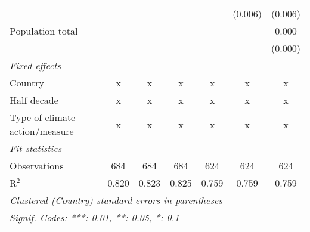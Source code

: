 \begin{tabular}{lcccccc}
                                                      &               &               &               &               & (0.006)       & (0.006)\\   
   Population total                                   &               &               &               &               &               & 0.000\\   
                                                      &               &               &               &               &               & (0.000)\\   
   \emph{Fixed effects}\\
   Country                                            & x             & x             & x             & x             & x             & x\\  
   Half decade                                        & x             & x             & x             & x             & x             & x\\  
   Type of climate action/measure                     & x             & x             & x             & x             & x             & x\\  
   \midrule \emph{Fit statistics}\\
   Observations                                       & 684           & 684           & 684           & 624           & 624           & 624\\  
   R$^2$                                              & 0.820         & 0.823         & 0.825         & 0.759         & 0.759         & 0.759\\  
   \midrule
   \multicolumn{7}{l}{\emph{Clustered (Country) standard-errors in parentheses}}\\
   \multicolumn{7}{l}{\emph{Signif. Codes: ***: 0.01, **: 0.05, *: 0.1}}\\
\end{tabular}
\par\endgroup


